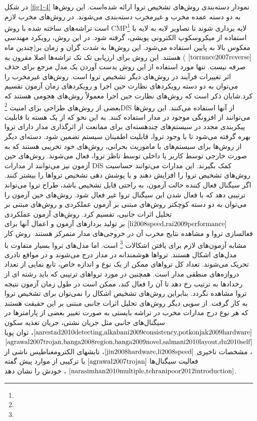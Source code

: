 در شکل \ref{fig1-4} نمودار دسته‌بندی روش‌های تشخیص تروا ارائه شده‌است. این روش‌ها به دو دسته عمده مخرب و غیرمخرب دسته‌بندی می‌شوند. در روش‌های مخرب لازم است تراشه‌های ساخته شده با روش CMP\footnote{} لایه برداری شوند تا تصاویر لایه به لایه با استفاده از میکروسکوپ الکترونی پویشی، گرفته شود. در این روش، رویکرد مهندسی معکوس بالا به پایین استفاده می‌شود. این روش‌ها به شدت گران و زمان بر(چندین ماه
$\cite{torrance2007reverse}$
) هستند. این روش برای ارزیابی تک تک تراشه‌ها اصلا مقرون به صرفه نیست. تنها مورد استفاده از این روش بدست آوردن یک مدل مرجع برای حذف اثر تغییرات فرآیند در روش‌های دیگر تشخیص تروا است. 
روش‌های غیرمخرب را می‌توان به دو دسته رویکردهای نظارت حین اجرا و رویکردهای زمان آزمون تقسیم کرد.شایان ذکر است که روش‌های نظارت حین اجرا معمولاً روش‌های هجومی هستند که بعضی از روش‌های طراحی برای امنیت \footnote{}DfS از آنها استفاده می‌کنند. این روش‌ها می‌توانند از افزونگی موجود در مدار استفاده کنند. به این نحو که از یک هسته با قابلیت پیکربندی مجدد در سیستم‌های چندهسته‌ای برای ممانعت از اثرگذاری مدار دارای تروا بهره گرفته می‌شود تا با وجود تروا، قابلیت اطمینان سیستم تضمین شود. دسته‌ای دیگر از روش‌ها برای سیستم‌های با ماموریت بحرانی، روش‌های خود تخریبی هستند که به صورت خارجی توسط کاربر یا داخلی توسط ناظر تروا، فعال می‌شوند. 
روش‌های حین آزمون نیز می‌توانند از مدارات DfS کمک بگیرند. این مدارات می‌توانند حساسیت روش‌های تشخیص تروا را افزایش دهند و یا پوشش دهی تشخیص تروا‌ها را بیشتر کنند. اگر سیگنال فعال کننده حالت آزمون، به راحتی قابل تشخیص باشد، طراح تروا می‌تواند ترتیبی دهد که با فعال شدن این سیگنال تروا غیر فعال شود. روش‌های حین آزمون را می‌توان به دو دسته کوچکتر روش‌های مبتنی بر آزمون عملکردی و روش‌های مبتنی بر تحلیل اثرات جانبی، تقسیم کرد.
روش‌های آزمون عملکردی 
$\cite{li2008speed,rai2009performance}$
بر تولید بردارهای آزمون و اعمال آنها برای فعالسازی تروا و مشاهده نتایج مخرب آن در خروجی‌های مدار متمرکز هستند. روش کار مشابه آزمون‌های لازم برای یافتن اشکالات \footnote{} است. اما مدل‌های تروا بسیار متفاوت با مدل‌های اشکال هستند. تروا‌ها هوشمندانه در مدار درج می‌شوند و در مواقع نادری تحریک می‌شوند. تعداد کل تروا‌های ممکن از یک نوع و اندازه خاص، تابع نمایی از تعداد دروازه‌های منطقی مدار است. همچنین در مورد تروا‌های ترتیبی که باید رشته ای از رخدادها به ترتیب رخ دهد تا آن را فعال کند، ممکن است در طول زمان آزمون نتیجه تروا مشاهده نگردد. بنابراین روش‌های تشخیص اشکال را نمی‌توان برای تشخیص تروا به کار گرفت.
از سویی دیگر روش‌های تحلیل اثرات جانبی مبتنی بر این حقیقت هستند که هر نوع درج مدارات مخرب در تراشه بایستی به صورت تغییر بعضی از پارامترها در سیگنال‌های جانبی مثل جریان نشتی، جریان تغذیه سکون $\cite{aarestad2010detecting,alkabani2009consistency,potkonjak2009hardware}$، توان پویا $\cite{agrawal2007trojan,banga2008region,banga2009novel,salmani2010layout,du2010self}$، مشخصات تاخیری $\cite{jin2008hardware,li2008speed}$، تابشهای الکترومغناطیس ناشی از فعالیت سیگنال‌ها $\cite{agrawal2007trojan}$ یا ترکیبی از موارد پیش گفته $\cite{narasimhan2010multiple,tehranipoor2012introduction}$ ، خودش را نشان دهد.
